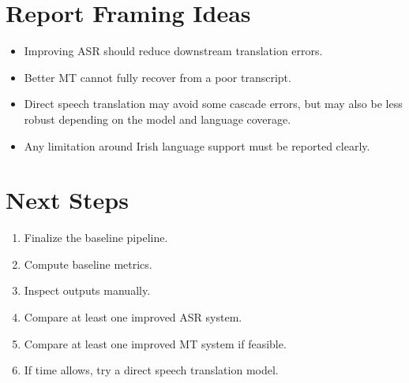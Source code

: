 \documentclass[11pt,a4paper]{article}
\begin{document}
\section{Report Framing Ideas}

\begin{itemize}[leftmargin=1.4em]
  \item Improving ASR should reduce downstream translation errors.
  \item Better MT cannot fully recover from a poor transcript.
  \item Direct speech translation may avoid some cascade errors, but may also be less robust depending on the model and language coverage.
  \item Any limitation around Irish language support must be reported clearly.
\end{itemize}

\section{Next Steps}

\begin{enumerate}[leftmargin=1.6em]
  \item Finalize the baseline pipeline.
  \item Compute baseline metrics.
  \item Inspect outputs manually.
  \item Compare at least one improved ASR system.
  \item Compare at least one improved MT system if feasible.
  \item If time allows, try a direct speech translation model.
\end{enumerate}
\end{document}
